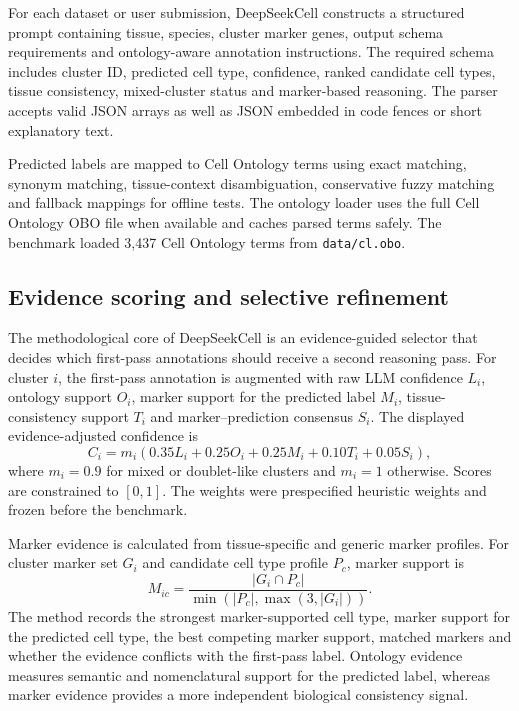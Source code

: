 \documentclass[unnumsec,webpdf,contemporary,large,numbered]{oup-authoring-template}
\begin{document}
For each dataset or user submission, DeepSeekCell constructs a structured prompt containing tissue, species, cluster marker genes, output schema requirements and ontology-aware annotation instructions. The required schema includes cluster ID, predicted cell type, confidence, ranked candidate cell types, tissue consistency, mixed-cluster status and marker-based reasoning. The parser accepts valid JSON arrays as well as JSON embedded in code fences or short explanatory text.

Predicted labels are mapped to Cell Ontology terms using exact matching, synonym matching, tissue-context disambiguation, conservative fuzzy matching and fallback mappings for offline tests. The ontology loader uses the full Cell Ontology OBO file when available and caches parsed terms safely. The benchmark loaded 3,437 Cell Ontology terms from \texttt{data/cl.obo}.

\subsection{Evidence scoring and selective refinement}

The methodological core of DeepSeekCell is an evidence-guided selector that decides which first-pass annotations should receive a second reasoning pass. For cluster $i$, the first-pass annotation is augmented with raw LLM confidence $L_i$, ontology support $O_i$, marker support for the predicted label $M_i$, tissue-consistency support $T_i$ and marker--prediction consensus $S_i$. The displayed evidence-adjusted confidence is
\begin{equation}
C_i = m_i(0.35L_i + 0.25O_i + 0.25M_i + 0.10T_i + 0.05S_i),
\end{equation}
where $m_i=0.9$ for mixed or doublet-like clusters and $m_i=1$ otherwise. Scores are constrained to $[0,1]$. The weights were prespecified heuristic weights and frozen before the benchmark.

Marker evidence is calculated from tissue-specific and generic marker profiles. For cluster marker set $G_i$ and candidate cell type profile $P_c$, marker support is
\begin{equation}
M_{ic} = \frac{|G_i \cap P_c|}{\min(|P_c|, \max(3, |G_i|))}.
\end{equation}
The method records the strongest marker-supported cell type, marker support for the predicted cell type, the best competing marker support, matched markers and whether the evidence conflicts with the first-pass label. Ontology evidence measures semantic and nomenclatural support for the predicted label, whereas marker evidence provides a more independent biological consistency signal.
\end{document}
